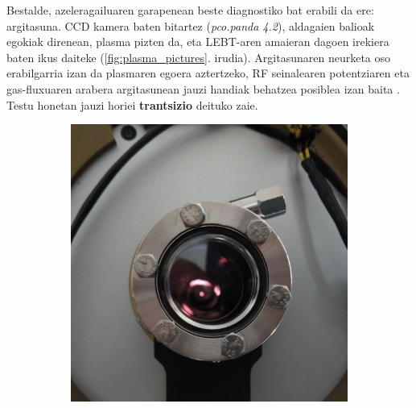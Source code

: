 \documentclass[12pt]{article}
\numberwithin{figure}{section}
\numberwithin{equation}{section}
\begin{document}
Bestalde, azeleragailuaren garapenean beste diagnostiko bat erabili da ere: argitasuna. CCD kamera baten bitartez (\textit{pco.panda 4.2}\cite{noauthor_pcopanda_2025}), aldagaien balioak egokiak direnean, plasma pizten da, eta LEBT-aren amaieran dagoen irekiera baten ikus daiteke (\ref{fig:plasma_pictures}. irudia). Argitasunaren neurketa oso erabilgarria izan da plasmaren egoera aztertzeko, RF seinalearen potentziaren eta gas-fluxuaren arabera argitasunean jauzi handiak behatzea posiblea izan baita \cite{elorza_romera_pit30_2021}. Testu honetan jauzi horiei \textbf{trantsizio} deituko zaie. \\

\begin{figure}[h]
    \centering
    \begin{subfigure}[b]{0.38\textwidth}
        \centering
        \includegraphics[width=\linewidth]{1 - Sarrera/plasma1.png}
    \end{subfigure}
    \hspace{0.02\textwidth}
    \begin{subfigure}[b]{0.38\textwidth}
        \centering

\end{subfigure}
\end{figure}
\end{document}
